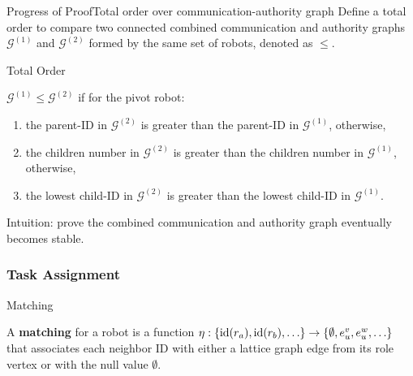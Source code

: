 \documentclass[10pt]{beamer}
\newcommand{\id}{{\rm id}}
\newcommand{\G}{\mathcal{G}}
\newcommand{\one}{^{(1)}}
\newcommand{\two}{^{(2)}}
\begin{document}
\begin{frame}{Progress of Proof}{Total order over communication-authority graph}
Define a total order to compare two connected combined communication and
authority graphs $\G\one$ and $\G\two$ formed by the same set of robots,
denoted as $\leq$.
\begin{block}{Total Order}
\small{
  $\G\one \leq \G\two$ if for the pivot robot:
  \begin{enumerate}
  \item the parent-ID in $\G\two$ is greater than the parent-ID in $\G\one$,
    otherwise,
  \item the children number in $\G\two$ is greater than the
    children number in $\G\one$, otherwise,
  \item the lowest child-ID in $\G\two$ is greater than the
    lowest child-ID in $\G\one$.
  \end{enumerate}}
\end{block}

 \textcolor{scred}{\footnotesize{Intuition: prove the combined
      communication and authority graph eventually becomes stable.}}
\end{frame}

\subsubsection{Task Assignment}
\begin{frame}{Matching}{}
  \begin{definition}    
    \small{A \textbf{matching} for a robot is a function $\eta : \{\id(r_a),
      \id(r_b), \ldots \} \rightarrow \{\emptyset,e_{u}^v, e_{u}^w,
      \ldots\} $ that associates each neighbor ID with either a lattice
      graph edge from its role vertex or with the null value
      $\emptyset$.}
  \end{definition}
  \begin{center}
    
  \end{center}
\end{frame}
\end{document}
